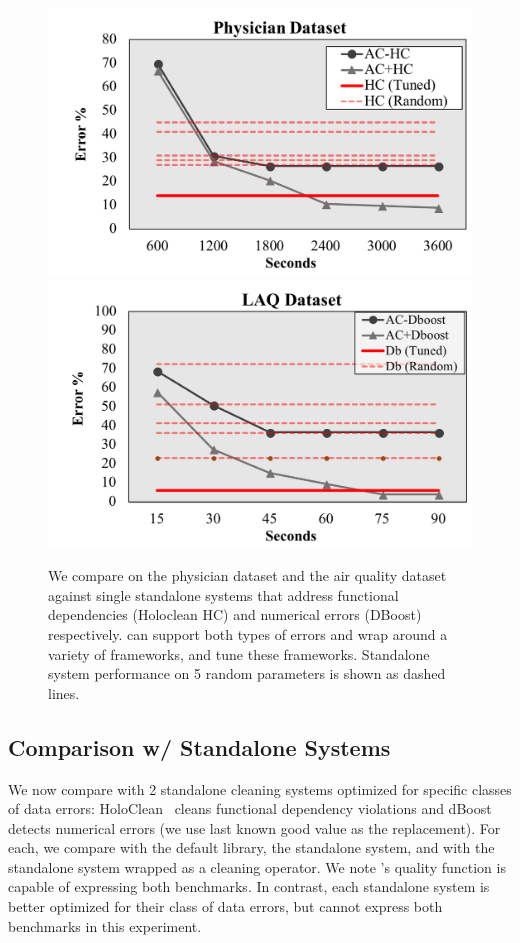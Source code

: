 \begin{figure}[h]
\centering
 \includegraphics[width=0.8\columnwidth]{exp/exp9a.png}
 \includegraphics[width=0.8\columnwidth]{exp/exp9b.png}
 \caption{We compare \sys on the physician dataset and the air quality dataset against single standalone systems that address functional dependencies (Holoclean HC) and numerical errors (DBoost) respectively. \sys can support both types of errors and wrap around a variety of frameworks, and tune these frameworks.  Standalone system performance on 5 random parameters is shown as dashed lines.   \label{exp9}}
\end{figure}

\subsection{Comparison w/ Standalone Systems}
We now compare \sys with 2 standalone cleaning systems optimized for specific classes of data errors: HoloClean~\cite{rekatsinas2017holoclean} cleans functional dependency violations and dBoost~\cite{mariet2016outlier} detects numerical errors (we use last known good value as the replacement).  For each, we compare \sys with the default library, the standalone system, and \sys with the standalone system wrapped as a cleaning operator. We note \sys's quality function is capable of expressing both benchmarks.  In contrast, each standalone system is better optimized for their class of data errors, but cannot express both benchmarks in this experiment.


